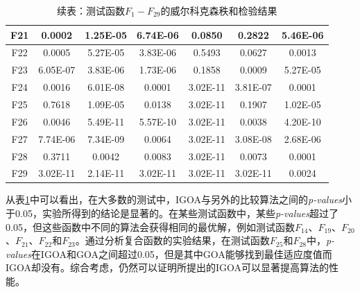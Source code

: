 \begin{table}[htbp]
    \ContinuedFloat%
    \centering
    \caption{续表：测试函数$F_1-F_{29}$的威尔科克森秩和检验结果}\label{tab:results_wilcoxon_rank_sum_test_IGOA}
    \renewcommand\arraystretch{1.3} 
    \begin{tabular}{*{7}{c}}
    {F21}& 0.0002&1.25E-05&6.74E-06&0.0850&0.2822&5.46E-06\\\hline
    {F22}& 0.0005&5.27E-05&3.83E-06&0.5493&0.0627&0.0013\\\hline
    {F23}& 6.05E-07&3.83E-06&1.73E-06&0.1858&0.0009&5.27E-05\\\hline
    {F24}& 0.0016&6.01E-08&0.0001&3.02E-11&3.81E-07&0.0001\\\hline
    {F25}& 0.7618&1.09E-05&0.0138&3.02E-11&0.1907&1.02E-05\\\hline
    {F26}& 0.0046&5.49E-11&5.57E-10&3.02E-11&0.0038&4.20E-10\\\hline
    {F27}& 7.74E-06&7.34E-09&0.0064&3.02E-11&3.08E-08&2.68E-06\\\hline
    {F28}& 0.3711&0.0042&0.0083&3.02E-11&0.0073&0.0001\\\hline
    {F29}& 3.02E-11&2.14E-11&3.02E-11&3.02E-11&3.02E-11&0.0024\\\hline
    
\end{tabular}
\end{table}

从表\ref{tab:results_wilcoxon_rank_sum_test_IGOA}中可以看出，在大多数的测试中，IGOA与另外的比较算法之间的\emph {p-values}小于0.05，实验所得到的结论是显著的。在某些测试函数中，某些\emph{p-values}超过了0.05，但这些函数中不同的算法会获得相同的最优解，例如测试函数$F_{14}$、$F_{19}$、$F_{20}$、$F_{21}$、$F_{22}$和$F_{23}$。通过分析复合函数的实验结果，在测试函数$F_{25}$和$F_{28}$中，\emph{p-values}在IGOA和GOA之间超过0.05，但是其中GOA能够找到最佳适应度值而IGOA却没有。综合考虑，仍然可以证明所提出的IGOA可以显著提高算法的性能。
